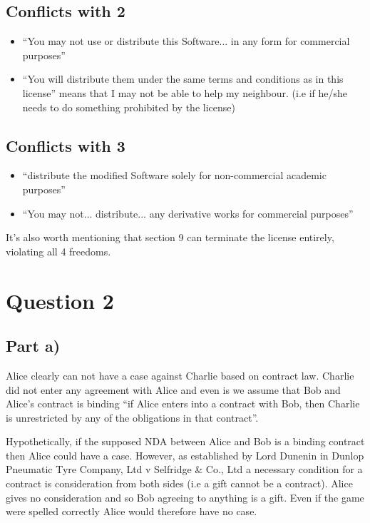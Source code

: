 \documentclass[a4paper, 6pt]{article}
\begin{document}
\subsection{Conflicts with 2}
\begin{itemize}
  \item ``You may not use or distribute this Software... in any form for commercial purposes''
  \item  ``You will distribute them under the same terms and conditions as in this license'' means that I may not be able to help my neighbour. (i.e if he/she needs to do something prohibited by the license)
\end{itemize}
\subsection{Conflicts with 3}
\begin{itemize}
  \item  ``distribute the modified Software solely for non-commercial academic purposes''
  \item  ``You may not... distribute... any derivative works for commercial purposes''
\end{itemize}

It's also worth mentioning that section 9 can terminate the license entirely, violating all 4 freedoms.

\section{Question 2}
\subsection{Part a)}
Alice clearly can not have a case against Charlie based on contract law. Charlie did not enter any agreement with Alice and even is we assume that Bob and Alice's contract is binding ``if Alice enters into a contract with Bob, then Charlie is unrestricted by any of the obligations in that contract''.

Hypothetically, if the supposed NDA between Alice and Bob is a binding contract then Alice could have a case. However, as established by Lord Dunenin in Dunlop Pneumatic Tyre Company, Ltd v Selfridge \& Co., Ltd a necessary condition for a contract is consideration from both sides (i.e a gift cannot be a contract). Alice gives no consideration and so Bob agreeing to anything is a gift. Even if the game were spelled correctly Alice would therefore have no case.
\end{document}
